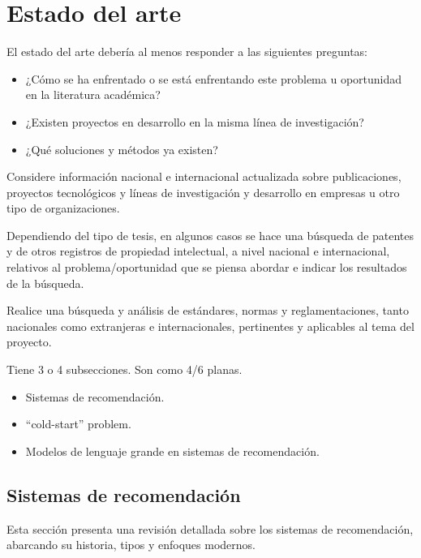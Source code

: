
\chapter{Estado del arte} %
\label{sec:Estado Arte} %

El estado del arte debería al menos responder a las siguientes preguntas:
\begin{itemize}
	\item ¿Cómo se ha enfrentado o se está enfrentando este problema u oportunidad en la literatura académica? 
	\item ¿Existen proyectos en desarrollo en la misma línea de investigación? 
	\item ¿Qué soluciones y métodos ya existen? 
\end{itemize}

Considere información nacional e internacional actualizada sobre publicaciones, proyectos tecnológicos y líneas de investigación y desarrollo en empresas u otro tipo de organizaciones. 

Dependiendo del tipo de tesis, en algunos casos se hace una búsqueda de patentes y de otros registros de propiedad intelectual, a nivel nacional e internacional, relativos al problema/oportunidad que se piensa abordar e indicar los resultados de la búsqueda. 

Realice una búsqueda y análisis de estándares, normas y reglamentaciones, tanto nacionales como extranjeras e internacionales, pertinentes y aplicables al tema del proyecto. 

Tiene 3 o 4 subsecciones. Son como 4/6 planas. 
\begin{itemize}
	\item Sistemas de recomendación.
	\item \enquote{cold-start} problem.
	\item Modelos de lenguaje grande en sistemas de recomendación.
\end{itemize}

\newpage

\section{Sistemas de recomendación}

	Esta sección presenta una revisión detallada sobre los sistemas de recomendación, abarcando su historia, tipos y enfoques modernos.


